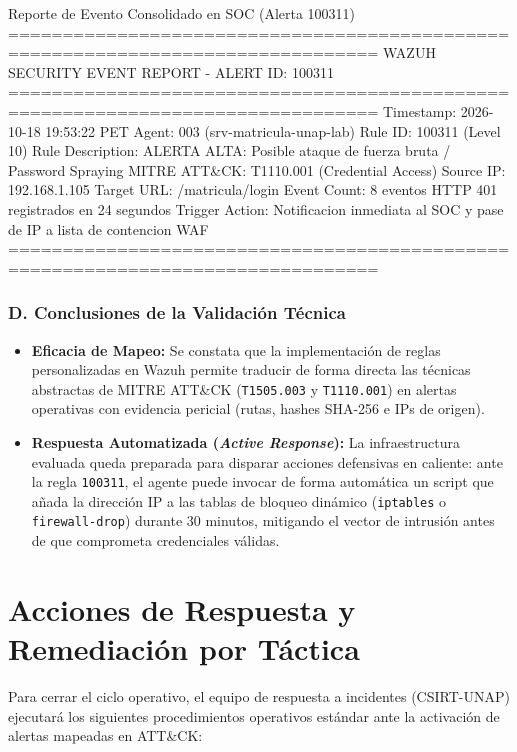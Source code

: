 \begin{cmdbox}{Reporte de Evento Consolidado en SOC (Alerta 100311)}
================================================================================
WAZUH SECURITY EVENT REPORT - ALERT ID: 100311
================================================================================
Timestamp:       2026-10-18 19:53:22 PET
Agent:           003 (srv-matricula-unap-lab)
Rule ID:         100311 (Level 10)
Rule Description: ALERTA ALTA: Posible ataque de fuerza bruta / Password Spraying
MITRE ATT&CK:    T1110.001 (Credential Access)
Source IP:       192.168.1.105
Target URL:      /matricula/login
Event Count:     8 eventos HTTP 401 registrados en 24 segundos
Trigger Action:  Notificacion inmediata al SOC y pase de IP a lista de contencion WAF
================================================================================
\end{cmdbox}

\subsubsection*{D. Conclusiones de la Validación Técnica}

\begin{itemize}
    \item \textbf{Eficacia de Mapeo:} Se constata que la implementación de reglas personalizadas en Wazuh permite traducir de forma directa las técnicas abstractas de MITRE ATT\&CK (\texttt{T1505.003} y \texttt{T1110.001}) en alertas operativas con evidencia pericial (rutas, hashes SHA-256 e IPs de origen).
    \item \textbf{Respuesta Automatizada (\textit{Active Response}):} La infraestructura evaluada queda preparada para disparar acciones defensivas en caliente: ante la regla \texttt{100311}, el agente puede invocar de forma automática un script que añada la dirección IP a las tablas de bloqueo dinámico (\texttt{iptables} o \texttt{firewall-drop}) durante 30 minutos, mitigando el vector de intrusión antes de que comprometa credenciales válidas.
\end{itemize}

\newpage
\section{Acciones de Respuesta y Remediación por Táctica}

Para cerrar el ciclo operativo, el equipo de respuesta a incidentes (CSIRT-UNAP) ejecutará los siguientes procedimientos operativos estándar ante la activación de alertas mapeadas en ATT\&CK:

